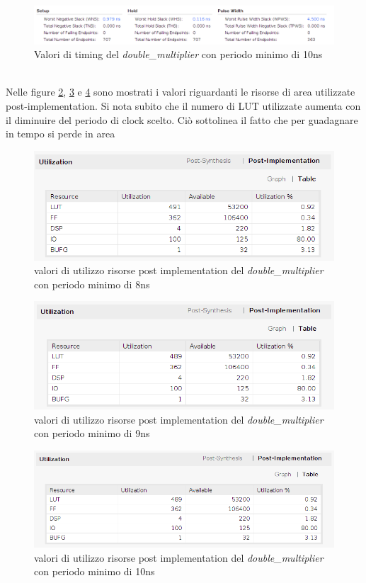 \documentclass[]{IEEEtran}
\begin{document}
\begin{figure}[!htb]
    \centering
    \includegraphics[width=1.0\linewidth]{figures/10-timing}
    \caption{Valori di timing del \textit{double\_multiplier} con periodo minimo di 10ns}
    \label{fig:TIMING_DM_10}
\end{figure}
\\Nelle figure \ref{fig:UTIL_IMPL_DM_8}, \ref{fig:UTIL_IMPL_DM_9} e \ref{fig:UTIL_IMPL_DM_10} sono mostrati i valori riguardanti le risorse di area utilizzate post-implementation. Si nota subito che il numero di LUT utilizzate aumenta con il diminuire del periodo di clock scelto. Ciò sottolinea il fatto che per guadagnare in tempo si perde in area
\begin{figure}[!htb]
    \centering
    \includegraphics[width=0.9\linewidth]{figures/8-util_impl}
    \caption{valori di utilizzo risorse post implementation del \textit{double\_multiplier} con periodo minimo di 8ns}
    \label{fig:UTIL_IMPL_DM_8}
\end{figure}
\begin{figure}[!htb]
    \centering
    \includegraphics[width=0.9\linewidth]{figures/9-util_impl}
    \caption{valori di utilizzo risorse post implementation del \textit{double\_multiplier} con periodo minimo di 9ns}
    \label{fig:UTIL_IMPL_DM_9}
\end{figure}
\begin{figure}[!htb]
    \centering
    \includegraphics[width=0.9\linewidth]{figures/10-util_impl}
    \caption{valori di utilizzo risorse post implementation del \textit{double\_multiplier} con periodo minimo di 10ns}
    \label{fig:UTIL_IMPL_DM_10}
\end{figure}
\end{document}
